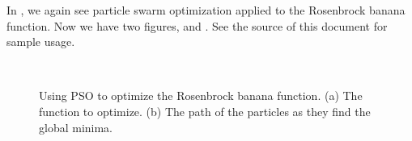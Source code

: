 \documentclass[master]{thesis}
\begin{document}
In , we again see particle swarm optimization applied to the Rosenbrock banana function.  Now we have two figures,  and .  See the source of this document for sample usage.

\vspace{-1em} 
\begin{figure}[p!] %
     \\


    \caption[Using PSO to optimize the Rosenbrock banana function.]{Using PSO to optimize the Rosenbrock banana function.  (a)  The function to optimize.  (b)  The path of the particles as they find the global minima.}

    \label{fig:pso.subfloat}
\end{figure}
\end{document}
